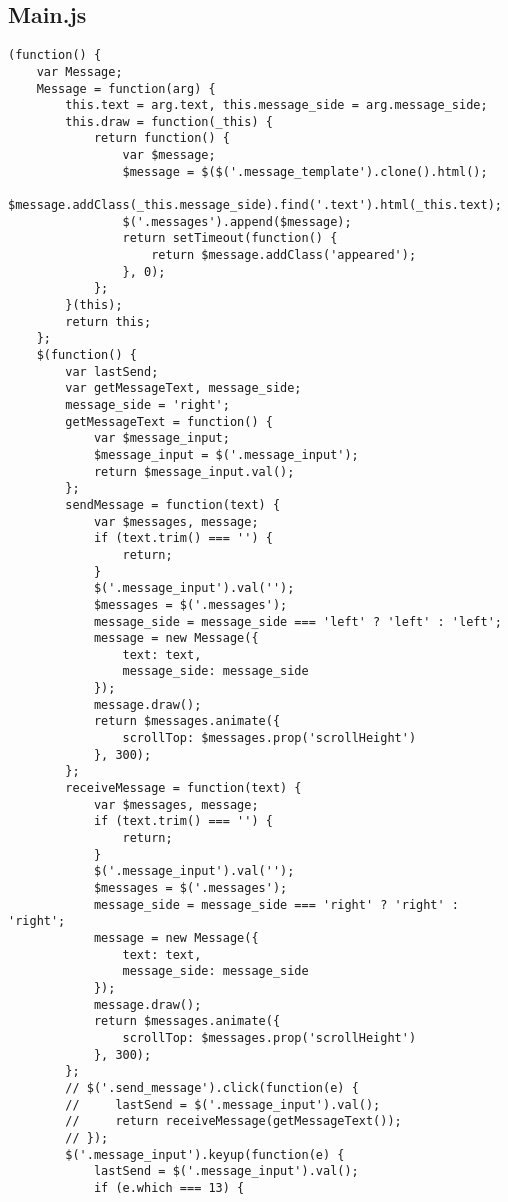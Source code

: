 \subsection*{Main.js}
\begin{verbatim}
(function() {  
    var Message;  
    Message = function(arg) {
        this.text = arg.text, this.message_side = arg.message_side;   
        this.draw = function(_this) {   
            return function() {
                var $message;
                $message = $($('.message_template').clone().html();
                $message.addClass(_this.message_side).find('.text').html(_this.text);
                $('.messages').append($message);
                return setTimeout(function() {
                    return $message.addClass('appeared');
                }, 0);
            };
        }(this);
        return this;
    };
    $(function() {
        var lastSend;
        var getMessageText, message_side;
        message_side = 'right';
        getMessageText = function() {
            var $message_input;
            $message_input = $('.message_input');
            return $message_input.val();
        };
        sendMessage = function(text) {
            var $messages, message;
            if (text.trim() === '') {
                return;
            }
            $('.message_input').val('');
            $messages = $('.messages');
            message_side = message_side === 'left' ? 'left' : 'left';
            message = new Message({
                text: text,
                message_side: message_side
            });
            message.draw();
            return $messages.animate({
                scrollTop: $messages.prop('scrollHeight')
            }, 300);
        };
        receiveMessage = function(text) {
            var $messages, message;
            if (text.trim() === '') {
                return;
            }
            $('.message_input').val('');
            $messages = $('.messages');
            message_side = message_side === 'right' ? 'right' : 'right';
            message = new Message({
                text: text,
                message_side: message_side
            });
            message.draw();
            return $messages.animate({
                scrollTop: $messages.prop('scrollHeight')
            }, 300);
        };
        // $('.send_message').click(function(e) {
        //     lastSend = $('.message_input').val();
        //     return receiveMessage(getMessageText());
        // });
        $('.message_input').keyup(function(e) {
            lastSend = $('.message_input').val();
            if (e.which === 13) {

\end{verbatim}
